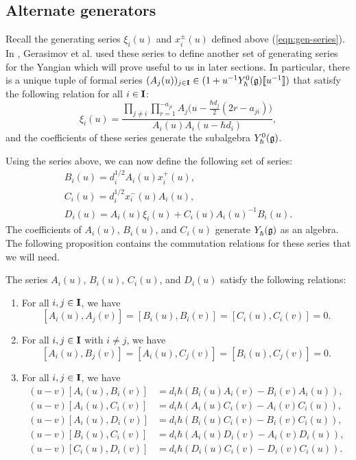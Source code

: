 \subsection{Alternate generators}\label{ssec:alt-gen}

Recall the generating series $\xi_i(u)$ and $x^\pm_i(u)$ defined above (\ref{eqn:gen-series}).
In \cite{gerasimov_class_2005}, Gerasimov et al. used these series to define another set of generating series for the Yangian which will prove useful to us in later sections.
In particular, there is a unique tuple of formal series $(A_j(u))_{j\in\I}\in (1+u^{-1}\Yhg[0]\db{u^{-1}})$ that satisfy the following relation for all $i\in\I$:
\[\xi_i(u) = \frac{\prod\limits_{j\neq i}\prod\limits_{r=1}^{-a_{ji}}A_j\bigl(u-\frac{\hbar d_j}{2}(2r-a_{ji})\bigr)}{A_i(u)A_i(u-\hbar d_i)},\]
and the coefficients of these series generate the subalgebra $\Yhg[0]$.

Using the series above, we can now define the following set of series:
\begin{gather*}
    B_i(u) = d_i^{1/2}A_i(u)x^+_i(u), \\
    C_i(u) = d_i^{1/2}x^-_i(u)A_i(u), \\
    D_i(u) = A_i(u)\xi_i(u) + C_i(u)A_i(u)^{-1}B_i(u).
\end{gather*}
The coefficients of $A_i(u)$, $B_i(u)$, and $C_i(u)$ generate $\Yhg$ as an algebra.
The following proposition \cite[Prop. 2.1]{gerasimov_class_2005} contains the commutation relations for these series that we will need.

\begin{proposition}\label{P:GKLO}
    The series $A_i(u)$, $B_i(u)$, $C_i(u)$, and $D_i(u)$ satisfy the following relations:
    \begin{enumerate}
        \item For all $i,j\in\I$, we have
        \[[A_i(u),A_j(v)] = [B_i(u),B_i(v)] = [C_i(u),C_i(v)] = 0.\]
        \item For all $i,j\in\I$ with $i\neq j$, we have
        \[[A_i(u),B_j(v)] = [A_i(u),C_j(v)] = [B_i(u),C_j(v)] = 0.\]
        \item For all $i,j\in\I$, we have
        \begin{align*}
            (u-v)[A_i(u),B_i(v)] &= d_i\hbar(B_i(u)A_i(v) - B_i(v)A_i(u)), \\
            (u-v)[A_i(u),C_i(v)] &= d_i\hbar(A_i(u)C_i(v) - A_i(v)C_i(u)), \\
            (u-v)[A_i(u),D_i(v)] &= d_i\hbar(B_i(u)C_i(v) - B_i(v)C_i(u)), \\
            (u-v)[B_i(u),C_i(v)] &= d_i\hbar(A_i(u)D_i(v) - A_i(v)D_i(u)), \\
            (u-v)[C_i(u),D_i(v)] &= d_i\hbar(D_i(u)C_i(v) - D_i(v)C_i(u)).
        \end{align*}
    \end{enumerate}
\end{proposition}


